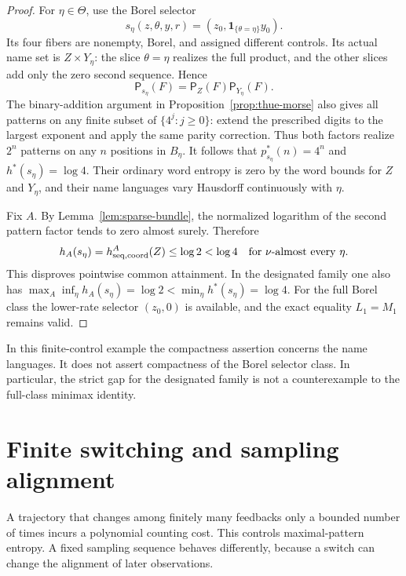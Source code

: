 \documentclass[11pt,reqno]{amsart}
\numberwithin{equation}{section}
\theoremstyle{definition}
\theoremstyle{definition}
\newcommand{\Patt}{\mathsf P}
\newcommand{\one}{\mathbf 1}
\begin{document}
\begin{proof}
For $\eta\in\Theta$, use the Borel selector
\[
 s_\eta(z,\theta,y,r)=(z_0,\one_{\{\theta=\eta\}}y_0).
\]
Its four fibers are nonempty, Borel, and assigned different
controls. Its actual name set is $Z\times Y_\eta$:
the slice $\theta=\eta$ realizes the full product, and the
other slices add only the zero second sequence. Hence
\[
 \Patt_{s_\eta}(F)=\Patt_Z(F)\Patt_{Y_\eta}(F).
\]
The binary-addition argument in Proposition~\ref{prop:thue-morse}
also gives all patterns on any finite subset of
$\{4^j:j\ge0\}$: extend the prescribed digits to the largest
exponent and apply the same parity correction. Thus both factors
realize $2^n$ patterns on any $n$ positions in $B_\eta$.
It follows that $p_{s_\eta}^*(n)=4^n$ and $h^*(s_\eta)=\log4$.
Their ordinary word entropy is zero by the word bounds for
$Z$ and $Y_\eta$, and their name languages vary Hausdorff
continuously with $\eta$.

Fix $A$. By Lemma~\ref{lem:sparse-bundle}, the normalized
logarithm of the second pattern factor tends to zero almost
surely. Therefore
\[
 h_A(s_\eta)=h_{\rm seq,coord}^A(Z)\le\log2<\log4
 \quad\text{for }\nu\text{-almost every }\eta.
\]
This disproves pointwise common attainment. In the designated
family one also has
$\max_A\inf_\eta h_A(s_\eta)=\log2<\min_\eta h^*(s_\eta)=\log4$.
For the full Borel class the lower-rate selector $(z_0,0)$
is available, and the exact equality $L_1=M_1$ remains valid.
\end{proof}

In this finite-control example the compactness assertion concerns
the name languages. It does not assert compactness of the Borel
selector class. In particular, the strict gap for the designated
family is not a counterexample to the full-class minimax identity.


\section{Finite switching and sampling alignment}\label{app:switching}

A trajectory that changes among finitely many feedbacks only a bounded
number of times incurs a polynomial counting cost. This controls
maximal-pattern entropy. A fixed sampling sequence behaves differently,
because a switch can change the alignment of later observations.
\end{document}
